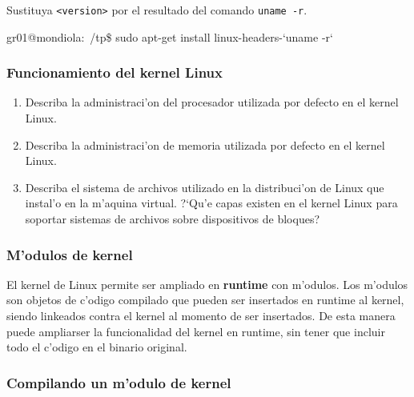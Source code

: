 Sustituya \texttt{<version>} por el resultado del comando \texttt{uname -r}.

\begin{envRespuesta}
gr01@mondiola:~/tp\$ sudo apt-get install linux-headers-`uname -r`
\end{envRespuesta}

\subsubsection{Funcionamiento del kernel Linux}

\begin{enumerate}

\item Describa la administraci'on del procesador utilizada por defecto en el kernel Linux.
\vspace{.5cm}



\item Describa la administraci'on de memoria utilizada por defecto en el kernel Linux.
\vspace{.5cm}


\item Describa el sistema de archivos utilizado en la distribuci'on de Linux que instal'o en la m'aquina virtual.
?`Qu'e capas existen en el kernel Linux para soportar sistemas de
archivos sobre dispositivos de bloques?

\vspace{.5cm}



\end{enumerate}

\subsubsection{M'odulos de kernel}

El kernel de Linux permite ser ampliado en \textbf{runtime} con m'odulos. Los m'odulos son objetos de c'odigo compilado
que pueden ser insertados en runtime al kernel, siendo linkeados contra el kernel al momento de ser insertados. De esta
manera puede ampliarser la funcionalidad del kernel en runtime, sin tener que incluir todo el c'odigo en el binario
original.

\subsubsection{Compilando un m'odulo de kernel}

